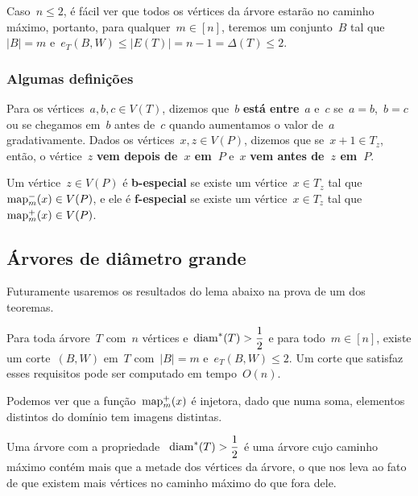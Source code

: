 	
	Caso~$n\le 2$, 
	é fácil ver que todos os vértices
	da árvore estarão no caminho máximo, portanto, para
	qualquer~$m\in[n]$, teremos um conjunto~$B$ tal
	que~$|B|=m$
	e~$e_T(B,W)\le |E(T)|=n-1=\Delta(T)\le 2$.

	\bigskip
	\bigskip

	\subsubsection*{Algumas definições}

	Para os vértices~${a,b,c\in V(T)}$, dizemos que~$b$
	\textbf{está entre}~$a$ e~$c$ se~${a=b}$,~${b=c}$ 
	ou se chegamos em~$b$ antes
	de~$c$ quando aumentamos o valor de~$a$  
	gradativamente.
	Dados os vértices~${x,z\in V(P)}$, dizemos que 
	se~${x+1\in T_z}$, então, o
	vértice~$z$ \textbf{vem depois de~$x$ em~$P$} 
	e~$x$ \textbf{vem antes de~$z$ em~$P$}.


	Um vértice~${z\in V(P)}$ é \textbf{b-especial}
	se existe um vértice~${x\in T_z}$ tal 
	que~${\mathrm{map}^{-}_m(x)\in V(P)}$, e ele é
	\textbf{f-especial} se existe um vértice~${x\in T_z}$
	tal que~${\mathrm{map}^{+}_m(x)\in V(P)}$.

	\bigskip
	\bigskip
	\bigskip
	\bigskip



	\subsection{Árvores de diâmetro grande}

	Futuramente usaremos os resultados do lema abaixo na prova de 
	um dos teoremas.

	\begin{lem}
	\label{lema:caminhoLongo}
		Para toda árvore~$T$ com~$n$ 
		vértices e~${\mathrm{diam}^*(T)>\dfrac{1}{2}}$
		e para todo~${m\in[n]}$, existe um corte~$(B,W)$ em~$T$
		com~${|B|=m}$ e~${e_T(B,W)\le 2}$. Um corte que satisfaz esses
		requisitos pode ser computado em tempo~$O(n)$.
	\end{lem}

	\medskip
	\medskip

	Podemos ver que a função~$\mathrm{map}^+_m(x)$ é injetora, dado que numa
	soma, elementos distintos do domínio tem imagens distintas.

	Uma árvore com a propriedade ~${\mathrm{diam}^*(T)>\dfrac{1}{2}}$ é uma
	árvore cujo caminho máximo contém mais que a metade dos 
	vértices da árvore, o que nos leva ao fato de que existem mais 
	vértices no caminho máximo do que fora dele. 

